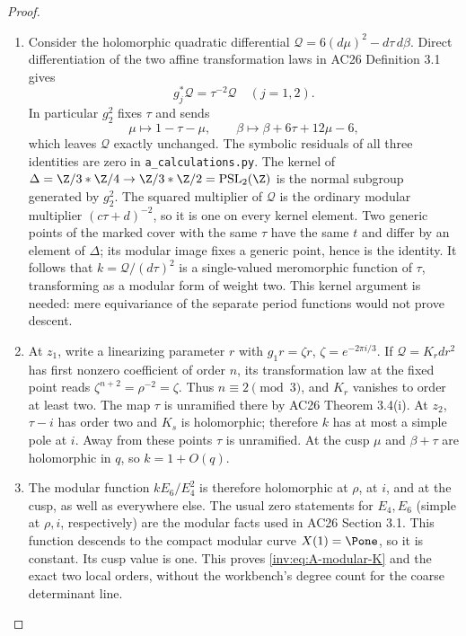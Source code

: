 \begin{proof}
\begin{enumerate}[label=\arabic*.,leftmargin=*]
\item Consider the holomorphic quadratic differential
$\mathscr Q=6(d\mu)^2-d\tau\,d\beta$.  Direct differentiation of
the two affine transformation laws in AC26 Definition 3.1 gives
\[
g_j^*\mathscr Q=\tau^{-2}\mathscr Q\quad(j=1,2).
\]
In particular $g_2^2$ fixes $\tau$ and sends
\[
\mu\longmapsto1-\tau-\mu,\qquad
\beta\longmapsto\beta+6\tau+12\mu-6,
\]
which leaves $\mathscr Q$ exactly unchanged.  The symbolic residuals
of all three identities are zero in \texttt{a\_calculations.py}.
The kernel of
$\Delta=\Z/3*\Z/4\to\Z/3*\Z/2=\operatorname{PSL}_2(\Z)$
is the normal subgroup generated by $g_2^2$.  The squared multiplier
of $\mathscr Q$ is the ordinary modular multiplier
$(c\tau+d)^{-2}$, so it is one on every kernel element.  Two generic
points of the marked cover with the same $\tau$ have the same $t$
and differ by an element of $\Delta$; its modular image fixes a
generic point, hence is the identity.  It follows that
$k=\mathscr Q/(d\tau)^2$ is a single-valued meromorphic function of
$\tau$, transforming as a modular form of weight two.  This kernel
argument is needed: mere equivariance of the separate period functions
would not prove descent.

\item At $z_1$, write a linearizing parameter $r$ with
$g_1r=\zeta r$, $\zeta=e^{-2\pi i/3}$.  If $\mathscr Q=K_rdr^2$
has first nonzero coefficient of order $n$, its transformation law
at the fixed point reads $\zeta^{n+2}=\rho^{-2}=\zeta$.
Thus $n\equiv2\pmod3$, and $K_r$ vanishes to order at least two.
The map $\tau$ is unramified there by AC26 Theorem 3.4(i).  At
$z_2$, $\tau-i$ has order two and $K_s$ is holomorphic; therefore
$k$ has at most a simple pole at $i$.  Away from these points
$\tau$ is unramified.  At the cusp $\mu$ and $\beta+\tau$ are
holomorphic in $q$, so $k=1+O(q)$.

\item The modular function $k E_6/E_4^2$ is therefore holomorphic at
$\rho$, at $i$, and at the cusp, as well as everywhere else.
The usual zero statements for $E_4,E_6$ (simple at $\rho,i$,
respectively) are the modular facts used in AC26 Section 3.1.
This function descends to the compact modular curve $X(1)=\Pone$,
so it is constant.  Its cusp value is one.  This proves
\eqref{inv:eq:A-modular-K} and the exact two local orders, without the
workbench's degree count for the coarse determinant line.


\end{enumerate}
\end{proof}
